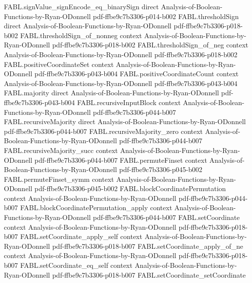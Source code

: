 \begin{theorem}
\proofstep
  {FABL.signValue_signEncode_eq_binarySign}
  {direct}
  {Analysis-of-Boolean-Functions-by-Ryan-ODonnell}
  {pdf-ffbe9c7b3306-p014-b002}
\proofstep
  {FABL.thresholdSign}
  {direct}
  {Analysis-of-Boolean-Functions-by-Ryan-ODonnell}
  {pdf-ffbe9c7b3306-p018-b002}
\proofstep
  {FABL.thresholdSign_of_nonneg}
  {context}
  {Analysis-of-Boolean-Functions-by-Ryan-ODonnell}
  {pdf-ffbe9c7b3306-p018-b002}
\proofstep
  {FABL.thresholdSign_of_neg}
  {context}
  {Analysis-of-Boolean-Functions-by-Ryan-ODonnell}
  {pdf-ffbe9c7b3306-p018-b002}
\proofstep
  {FABL.positiveCoordinateSet}
  {context}
  {Analysis-of-Boolean-Functions-by-Ryan-ODonnell}
  {pdf-ffbe9c7b3306-p043-b004}
\proofstep
  {FABL.positiveCoordinateCount}
  {context}
  {Analysis-of-Boolean-Functions-by-Ryan-ODonnell}
  {pdf-ffbe9c7b3306-p043-b004}
\proofstep
  {FABL.majority}
  {direct}
  {Analysis-of-Boolean-Functions-by-Ryan-ODonnell}
  {pdf-ffbe9c7b3306-p043-b004}
\proofstep
  {FABL.recursiveInputBlock}
  {context}
  {Analysis-of-Boolean-Functions-by-Ryan-ODonnell}
  {pdf-ffbe9c7b3306-p044-b007}
\proofstep
  {FABL.recursiveMajority}
  {direct}
  {Analysis-of-Boolean-Functions-by-Ryan-ODonnell}
  {pdf-ffbe9c7b3306-p044-b007}
\proofstep
  {FABL.recursiveMajority_zero}
  {context}
  {Analysis-of-Boolean-Functions-by-Ryan-ODonnell}
  {pdf-ffbe9c7b3306-p044-b007}
\proofstep
  {FABL.recursiveMajority_succ}
  {context}
  {Analysis-of-Boolean-Functions-by-Ryan-ODonnell}
  {pdf-ffbe9c7b3306-p044-b007}
\proofstep
  {FABL.permuteFinset}
  {context}
  {Analysis-of-Boolean-Functions-by-Ryan-ODonnell}
  {pdf-ffbe9c7b3306-p045-b002}
\proofstep
  {FABL.permuteFinset_symm}
  {context}
  {Analysis-of-Boolean-Functions-by-Ryan-ODonnell}
  {pdf-ffbe9c7b3306-p045-b002}
\proofstep
  {FABL.blockCoordinatePermutation}
  {context}
  {Analysis-of-Boolean-Functions-by-Ryan-ODonnell}
  {pdf-ffbe9c7b3306-p044-b007}
\proofstep
  {FABL.blockCoordinatePermutation_apply}
  {context}
  {Analysis-of-Boolean-Functions-by-Ryan-ODonnell}
  {pdf-ffbe9c7b3306-p044-b007}
\proofstep
  {FABL.setCoordinate}
  {context}
  {Analysis-of-Boolean-Functions-by-Ryan-ODonnell}
  {pdf-ffbe9c7b3306-p018-b007}
\proofstep
  {FABL.setCoordinate_apply_self}
  {context}
  {Analysis-of-Boolean-Functions-by-Ryan-ODonnell}
  {pdf-ffbe9c7b3306-p018-b007}
\proofstep
  {FABL.setCoordinate_apply_of_ne}
  {context}
  {Analysis-of-Boolean-Functions-by-Ryan-ODonnell}
  {pdf-ffbe9c7b3306-p018-b007}
\proofstep
  {FABL.setCoordinate_eq_self}
  {context}
  {Analysis-of-Boolean-Functions-by-Ryan-ODonnell}
  {pdf-ffbe9c7b3306-p018-b007}
\proofstep
  {FABL.setCoordinate_setCoordinate}

\end{theorem}
